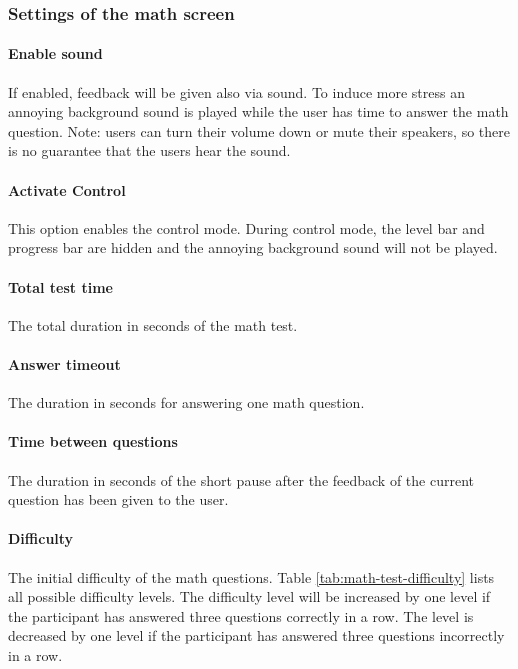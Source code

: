 \subsubsection*{Settings of the math screen}

\paragraph{Enable sound}
If enabled, feedback will be given also via sound. 
To induce more stress an annoying background sound is played while the user has time to answer the math question.
Note: users can turn their volume down or mute their speakers, so there is no guarantee that the users hear the sound.

\paragraph{Activate Control}
This option enables the control mode.
During control mode, the level bar and progress bar are hidden and the annoying background sound will not be played.

\paragraph{Total test time}
The total duration in seconds of the math test.

\paragraph{Answer timeout}
The duration in seconds for answering one math question.

\paragraph{Time between questions}
The duration in seconds of the short pause after the feedback of the current question has been given to the user.

\paragraph{Difficulty}
The initial difficulty of the math questions.
Table \ref{tab:math-test-difficulty} lists all possible difficulty levels.
The difficulty level will be increased by one level if the participant has answered three questions correctly in a row.
The level is decreased by one level if the participant has answered three questions incorrectly in a row.

